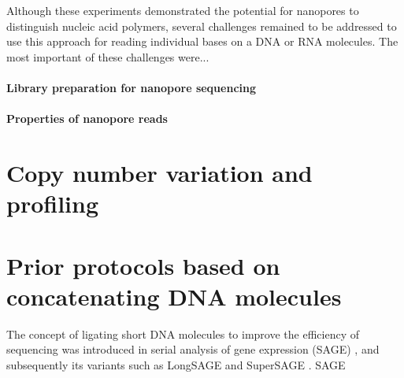 Although these experiments demonstrated the potential for nanopores to
distinguish nucleic acid polymers, several challenges remained to be
addressed to use this approach for reading individual bases on a DNA or
RNA molecules.
%
The most important of these challenges were...





\paragraph{Library preparation for nanopore sequencing}


\paragraph{Properties of nanopore reads}



\section{Copy number variation and profiling}


\section{Prior protocols based on concatenating DNA molecules}
The concept of ligating short DNA molecules to improve the efficiency
of sequencing was introduced in serial analysis of gene expression
(SAGE) \citep{}, and subsequently its variants such as LongSAGE and
SuperSAGE \citep{}. SAGE




